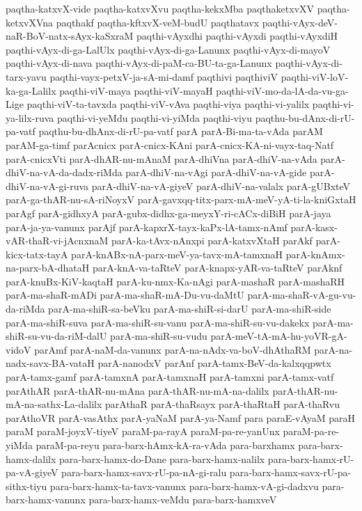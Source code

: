 {paqtha-katxvX-vide
paqtha-katxvXvu
paqtha-kekxMba
paqthaketxvXV
paqtha-ketxvXVna
paqthakf
paqtha-kftxvX-veM-budU
paqthatavx
paqthi-vAyx-deV-naR-BoV-natx-sAyx-kaSxraM
paqthi-vAyxdhi
paqthi-vAyxdi
paqthi-vAyxdiH
paqthi-vAyx-di-ga-LalUlx
paqthi-vAyx-di-ga-Lanunx
paqthi-vAyx-di-mayoV
paqthi-vAyx-di-nava
paqthi-vAyx-di-paM-ca-BU-ta-ga-Lanunx
paqthi-vAyx-di-tarx-yavu
paqthi-vayx-petxV-ja-sA-mi-damf
paqthivi
paqthiviV
paqthi-viV-loV-ka-ga-Lalilx
paqthi-viV-maya
paqthi-viV-mayaH
paqthi-viV-mo-da-lA-da-vu-ga-Lige
paqthi-viV-ta-tavxda
paqthi-viV-vAva
paqthi-viya
paqthi-vi-yalilx
paqthi-vi-ya-lilx-ruva
paqthi-vi-yeMdu
paqthi-vi-yiMda
paqthi-viyu
paqthu-bu-dAnx-di-rU-pa-vatf
paqthu-bu-dhAnx-di-rU-pa-vatf
parA
parA-Bi-ma-ta-vAda
parAM
parAM-ga-timf
parAcnicx
parA-cnicx-KAni
parA-cnicx-KA-ni-vayx-taq-Natf
parA-cnicxVti
parA-dhAR-nu-mAnaM
parA-dhiVna
parA-dhiV-na-vAda
parA-dhiV-na-vA-da-dadx-riMda
parA-dhiV-na-vAgi
parA-dhiV-na-vA-gide
parA-dhiV-na-vA-gi-ruva
parA-dhiV-na-vA-giyeV
parA-dhiV-na-valalx
parA-gUBxteV
parA-ga-thAR-nu-sA-riNoyxV
parA-gavxqq-titx-parx-mA-meV-yA-ti-la-kniGxtaH
parAgf
parA-gidhxyA
parA-gubx-didhx-ga-meyxY-ri-cACx-diBiH
parA-jaya
parA-ja-ya-vanunx
parAjf
parA-kapxrX-tayx-kaPx-lA-tamx-nAmf
parA-kasx-vAR-thaR-vi-jAcnxnaM
parA-ka-tAvx-nAnxpi
parA-katxvXtaH
parAkf
parA-kicx-tatx-tayA
parA-knABx-nA-parx-meV-ya-tavx-mA-tamxnaH
parA-knAmx-na-parx-bA-dhataH
parA-knA-va-taRteV
parA-knapx-yAR-va-taRteV
parAknf
parA-knuBx-KiV-kaqtaH
parA-ku-nmx-Ka-nAgi
parA-mashaR
parA-mashaRH
parA-ma-shaR-mADi
parA-ma-shaR-mA-Du-vu-daMtU
parA-ma-shaR-vA-gu-vu-da-riMda
parA-ma-shiR-sa-beVku
parA-ma-shiR-si-darU
parA-ma-shiR-side
parA-ma-shiR-suva
parA-ma-shiR-su-vanu
parA-ma-shiR-su-vu-dakekx
parA-ma-shiR-su-vu-da-riM-dalU
parA-ma-shiR-su-vudu
parA-meV-tA-mA-hu-yoVR-gA-vidoV
parAmf
parA-naM-da-vanunx
parA-na-nAdx-va-boV-dhAthaRM
parA-na-nadx-savx-BA-vataH
parA-nanodxV
parAnf
parA-tamx-BeV-da-kalxqqpwtx
parA-tamx-gamf
parA-tamxnA
parA-tamxnaH
parA-tamxni
parA-tamx-vatf
parAthAR
parA-thAR-nu-mAna
parA-thAR-nu-mA-na-dalilx
parA-thAR-nu-mA-na-sathx-La-dalilx
parAthaR
parA-thaRsayx
parA-thaRtaH
parA-thaRvu
parAthoVR
parA-vasAthx
parA-yaNaM
parA-ya-Namf
para
paraE-vAyaM
paraH
paraM
paraM-joyxV-tiyeV
paraM-pa-rayA
paraM-pa-re-yanUnx
paraM-pa-re-yiMda
paraM-pa-reyu
para-barx-hAmx-kA-ra-vAda
para-barxhamx
para-barx-hamx-dalilx
para-barx-hamx-do-Dane
para-barx-hamx-nalilx
para-barx-hamx-rU-pa-vA-giyeV
para-barx-hamx-savx-rU-pa-nA-gi-ralu
para-barx-hamx-savx-rU-pa-sithx-tiyu
para-barx-hamx-ta-tavx-vanunx
para-barx-hamx-vA-gi-dadxvu
para-barx-hamx-vanunx
para-barx-hamx-veMdu
para-barx-hamxveV
}
